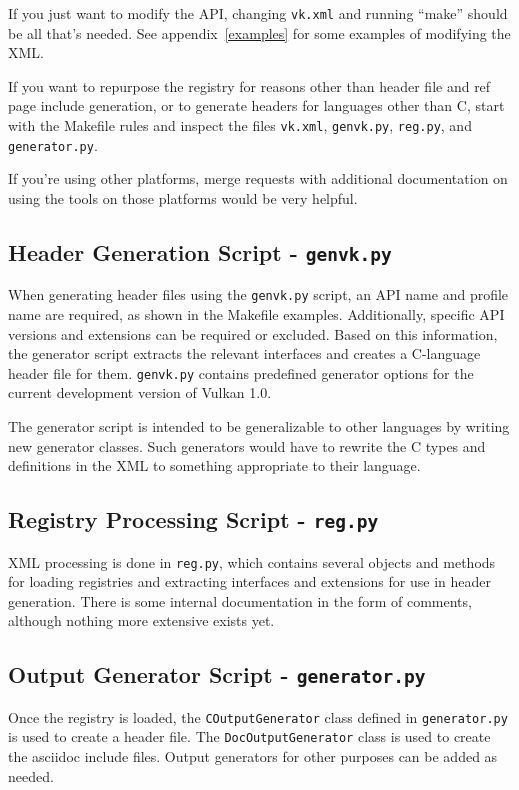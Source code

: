 \documentclass{article}
\def\code#1{{\tt #1}}
\begin{document}
If you just want to modify the API, changing \code{vk.xml} and running
``make'' should be all that's needed. See appendix~\ref{examples} for some
examples of modifying the XML.

If you want to repurpose the registry for reasons other than header file
and ref page include generation, or to generate headers for languages
other than C, start with the Makefile rules and inspect the files
\code{vk.xml}, \code{genvk.py}, \code{reg.py}, and \code{generator.py}.

If you're using other platforms, merge requests with additional
documentation on using the tools on those platforms would be very helpful.

\subsection{Header Generation Script - \code{genvk.py}}

When generating header files using the \code{genvk.py} script, an API name
and profile name are required, as shown in the Makefile examples.
Additionally, specific API versions and extensions can be required or
excluded. Based on this information, the generator script extracts the
relevant interfaces and creates a C-language header file for them.
\code{genvk.py} contains predefined generator options for the current
development version of Vulkan 1.0.

The generator script is intended to be generalizable to other languages by
writing new generator classes. Such generators would have to rewrite the C
types and definitions in the XML to something appropriate to their language.

\subsection{Registry Processing Script - \code{reg.py}}

XML processing is done in \code{reg.py}, which contains several objects and
methods for loading registries and extracting interfaces and extensions for
use in header generation. There is some internal documentation in the form
of comments, although nothing more extensive exists yet.

\subsection{Output Generator Script - \code{generator.py}}

Once the registry is loaded, the \code{COutputGenerator} class defined in
\code{generator.py} is used to create a header file. The
\code{DocOutputGenerator} class is used to create the asciidoc include
files. Output generators for other purposes can be added as needed.
\end{document}
